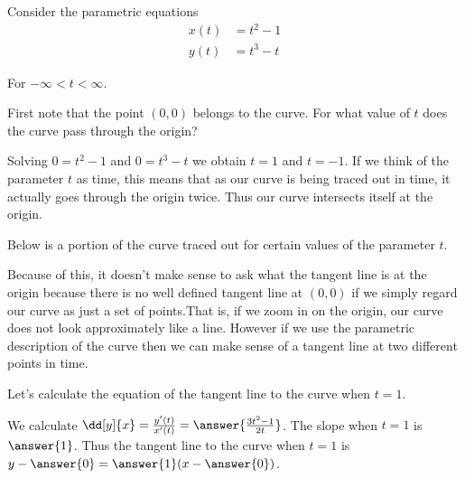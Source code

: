 \documentclass{ximera}
\author{Jim Talamo}
\begin{document}
\begin{exercise}
Consider the parametric equations 
\begin{align*}
x(t) &= t^2-1\\
y(t) &= t^3-t
\end{align*}

For $-\infty < t < \infty$.

First note that the point $(0,0)$ belongs to the curve. For what value of $t$ does the curve pass through the origin?

Solving $0=t^2-1$ and $0=t^3-t$ we obtain $t=1$ and $t=-1$. If we think of the parameter $t$ as time, this means that as our 
curve is being traced out in time, it actually goes through the origin twice. Thus our curve intersects itself at the origin. 

Below is a portion of the curve traced out for certain values of the parameter $t$.

\begin{image}  
\end{image} 



Because of this, it doesn't make sense to ask what the tangent line is at the origin because there is no well defined tangent line at $(0,0)$ if we simply regard our curve as just a set of points.That is, if we zoom in on the origin, our curve does not look approximately like a line. However if we use the parametric description of the curve then we can make sense of a tangent line at two different points in time. 

Let's calculate the equation of the tangent line to the curve when $t=1$. 

We calculate $\dd[y]{x}=\frac{y'(t)}{x'(t)}=\answer{ \frac{3t^2-1}{2t}}$. The slope when $t=1$ is $\answer{1}$. Thus the tangent line to the curve when $t=1$ is
$y-\answer{0}=\answer{1}(x-\answer{0})$. 


\end{exercise}
\end{document}
